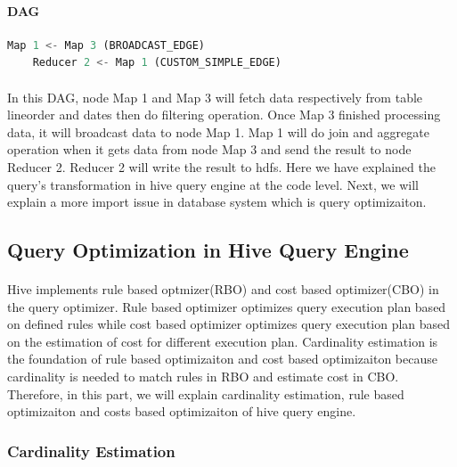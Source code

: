         \paragraph*{DAG}
        \begin{lstlisting}[language={SQL},%frame=shadowbox,    
            keywordstyle=\color{blue!30!black},  
            basicstyle=\ttfamily]  
    Map 1 <- Map 3 (BROADCAST_EDGE)
    Reducer 2 <- Map 1 (CUSTOM_SIMPLE_EDGE)
        \end{lstlisting} 
        \paragraph{}
        In this DAG, node Map 1 and Map 3 will fetch data respectively from table lineorder and dates then 
        do filtering operation. Once Map 3 finished processing data, it will broadcast data to node Map 1. 
        Map 1 will do join and aggregate operation when it gets data from node Map 3 and send the result to 
        node Reducer 2. Reducer 2 will write the result to hdfs. Here we have explained the query's transformation 
        in hive query engine at the code level. Next, we will explain a more import issue in database system which 
        is query optimizaiton.

    \subsection{Query Optimization in Hive Query Engine}
        \paragraph{}
        Hive implements rule based optmizer(RBO) and cost based optimizer(CBO) in the query optimizer. Rule based 
        optimizer optimizes query execution plan based on defined rules while cost based optimizer optimizes query execution 
        plan based on the estimation of cost for different execution plan. Cardinality estimation is the foundation of 
        rule based optimizaiton and cost based optimizaiton because cardinality is needed to match rules in RBO and estimate 
        cost in CBO. Therefore, in this part, we will explain cardinality estimation, rule based optimizaiton and costs based 
        optimizaiton of hive query engine.
        \subsubsection{Cardinality Estimation}
